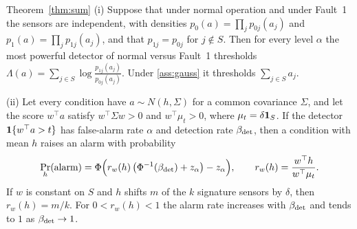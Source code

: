 \begin{restated}{Theorem~\ref{thm:sum}}
(i) Suppose that under normal operation and under Fault~1 the sensors are independent, with densities $p_0(a)=\prod_jp_{0j}(a_j)$ and $p_1(a)=\prod_jp_{1j}(a_j)$, and that $p_{1j}=p_{0j}$ for $j\notin S$. Then for every level $\alpha$ the most powerful detector of normal versus Fault~1 thresholds $\Lambda(a)=\sum_{j\in S}\log\frac{p_{1j}(a_j)}{p_{0j}(a_j)}$. Under \cref{ass:gauss} it thresholds $\sum_{j\in S}a_j$.

(ii) Let every condition have $a\sim N(h,\Sigma)$ for a common covariance $\Sigma$, and let the score $w^\top a$ satisfy $w^\top\Sigma w>0$ and $w^\top\mu_t>0$, where $\mu_t=\delta\mathbf{1}_S$. If the detector $\mathbf{1}\{w^\top a>t\}$ has false-alarm rate $\alpha$ and detection rate $\beta_{\mathrm{det}}$, then a condition with mean $h$ raises an alarm with probability
\begin{equation}\label{eq:law}
  \Pr_h(\text{alarm})=\Phi\Big(r_w(h)\,\big(\Phi^{-1}(\beta_{\mathrm{det}})+z_\alpha\big)-z_\alpha\Big),
  \qquad
  r_w(h)=\frac{w^\top h}{w^\top\mu_t}.
\end{equation}
If $w$ is constant on $S$ and $h$ shifts $m$ of the $k$ signature sensors by $\delta$, then $r_w(h)=m/k$. For $0<r_w(h)<1$ the alarm rate increases with $\beta_{\mathrm{det}}$ and tends to $1$ as $\beta_{\mathrm{det}}\to1$.
\end{restated}

